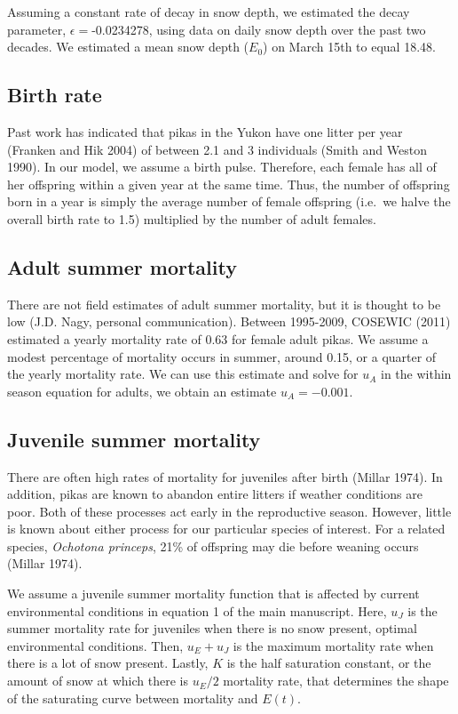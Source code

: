 \documentclass[12pt,]{article}
\begin{document}
Assuming a constant rate of decay in snow depth, we estimated the decay
parameter, \(\epsilon=\)-0.0234278, using data on daily snow depth over
the past two decades. We estimated a mean snow depth (\(E_0\)) on March
15th to equal 18.48.

\pagebreak

\subsection{Birth rate}

Past work has indicated that pikas in the Yukon have one litter per year
(Franken and Hik 2004) of between 2.1 and 3 individuals (Smith and
Weston 1990). In our model, we assume a birth pulse. Therefore, each
female has all of her offspring within a given year at the same time.
Thus, the number of offspring born in a year is simply the average
number of female offspring (i.e.~we halve the overall birth rate to 1.5)
multiplied by the number of adult females.

\subsection{Adult summer mortality}

There are not field estimates of adult summer mortality, but it is
thought to be low (J.D. Nagy, personal communication). Between
1995-2009, COSEWIC (2011) estimated a yearly mortality rate of 0.63 for
female adult pikas. We assume a modest percentage of mortality occurs in
summer, around 0.15, or a quarter of the yearly mortality rate. We can
use this estimate and solve for \(u_A\) in the within season equation
for adults, we obtain an estimate \(u_A = -0.001\).

\subsection{Juvenile summer mortality}

There are often high rates of mortality for juveniles after birth
(Millar 1974). In addition, pikas are known to abandon entire litters if
weather conditions are poor. Both of these processes act early in the
reproductive season. However, little is known about either process for
our particular species of interest. For a related species,
\emph{Ochotona princeps}, 21\% of offspring may die before weaning
occurs (Millar 1974).

We assume a juvenile summer mortality function that is affected by
current environmental conditions in equation 1 of the main manuscript.
Here, \(u_J\) is the summer mortality rate for juveniles when there is
no snow present, optimal environmental conditions. Then, \(u_E + u_J\)
is the maximum mortality rate when there is a lot of snow present.
Lastly, \(K\) is the half saturation constant, or the amount of snow at
which there is \(u_E/2\) mortality rate, that determines the shape of
the saturating curve between mortality and \(E(t)\).
\end{document}
